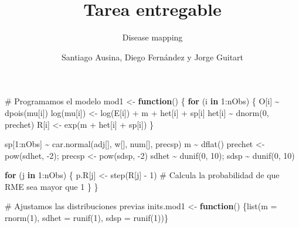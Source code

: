 \documentclass[
  10pt,
  letterpaper,
  DIV=11,
  numbers=noendperiod]{scrartcl}
\title{Tarea entregable}
\subtitle{Disease mapping}
\author{Santiago Ausina, Diego Fernández y Jorge Guitart}
\date{}
\newenvironment{Shaded}{\begin{snugshade}}{\end{snugshade}}
\newcommand{\AttributeTok}[1]{\textcolor[rgb]{0.40,0.45,0.13}{#1}}
\newcommand{\CommentTok}[1]{\textcolor[rgb]{0.37,0.37,0.37}{#1}}
\newcommand{\ControlFlowTok}[1]{\textcolor[rgb]{0.00,0.23,0.31}{\textbf{#1}}}
\newcommand{\DecValTok}[1]{\textcolor[rgb]{0.68,0.00,0.00}{#1}}
\newcommand{\FunctionTok}[1]{\textcolor[rgb]{0.28,0.35,0.67}{#1}}
\newcommand{\NormalTok}[1]{\textcolor[rgb]{0.00,0.23,0.31}{#1}}
\newcommand{\OtherTok}[1]{\textcolor[rgb]{0.00,0.23,0.31}{#1}}
\newcommand{\SpecialCharTok}[1]{\textcolor[rgb]{0.37,0.37,0.37}{#1}}
\begin{document}
\maketitle


\begin{Shaded}
\begin{Highlighting}[]
\CommentTok{\# Programamos el modelo}
\NormalTok{mod1 }\OtherTok{\textless{}{-}} \ControlFlowTok{function}\NormalTok{() \{}
  \ControlFlowTok{for}\NormalTok{ (i }\ControlFlowTok{in} \DecValTok{1}\SpecialCharTok{:}\NormalTok{nObs) \{}
\NormalTok{    O[i] }\SpecialCharTok{\textasciitilde{}} \FunctionTok{dpois}\NormalTok{(mu[i])}
    \FunctionTok{log}\NormalTok{(mu[i]) }\OtherTok{\textless{}{-}} \FunctionTok{log}\NormalTok{(E[i]) }\SpecialCharTok{+}\NormalTok{ m }\SpecialCharTok{+}\NormalTok{ het[i] }\SpecialCharTok{+}\NormalTok{ sp[i]}
\NormalTok{    het[i] }\SpecialCharTok{\textasciitilde{}} \FunctionTok{dnorm}\NormalTok{(}\DecValTok{0}\NormalTok{, prechet)}
\NormalTok{    R[i] }\OtherTok{\textless{}{-}} \FunctionTok{exp}\NormalTok{(m }\SpecialCharTok{+}\NormalTok{ het[i] }\SpecialCharTok{+}\NormalTok{ sp[i])}
\NormalTok{  \}}
  
\NormalTok{  sp[}\DecValTok{1}\SpecialCharTok{:}\NormalTok{nObs] }\SpecialCharTok{\textasciitilde{}} \FunctionTok{car.normal}\NormalTok{(adj[], w[], num[], precsp)}
\NormalTok{  m }\SpecialCharTok{\textasciitilde{}} \FunctionTok{dflat}\NormalTok{()}
\NormalTok{  prechet }\OtherTok{\textless{}{-}} \FunctionTok{pow}\NormalTok{(sdhet, }\SpecialCharTok{{-}}\DecValTok{2}\NormalTok{); precsp }\OtherTok{\textless{}{-}} \FunctionTok{pow}\NormalTok{(sdsp, }\SpecialCharTok{{-}}\DecValTok{2}\NormalTok{)}
\NormalTok{  sdhet }\SpecialCharTok{\textasciitilde{}} \FunctionTok{dunif}\NormalTok{(}\DecValTok{0}\NormalTok{, }\DecValTok{10}\NormalTok{); sdsp }\SpecialCharTok{\textasciitilde{}} \FunctionTok{dunif}\NormalTok{(}\DecValTok{0}\NormalTok{, }\DecValTok{10}\NormalTok{)}
  
  \ControlFlowTok{for}\NormalTok{ (j }\ControlFlowTok{in} \DecValTok{1}\SpecialCharTok{:}\NormalTok{nObs) \{}
\NormalTok{    p.R[j] }\OtherTok{\textless{}{-}} \FunctionTok{step}\NormalTok{(R[j] }\SpecialCharTok{{-}} \DecValTok{1}\NormalTok{) }\CommentTok{\# Calcula la probabilidad de que RME sea mayor que 1}
\NormalTok{  \}}
\NormalTok{\}}

\CommentTok{\# Ajustamos las distribuciones previas}
\NormalTok{inits.mod1 }\OtherTok{\textless{}{-}} \ControlFlowTok{function}\NormalTok{() \{}\FunctionTok{list}\NormalTok{(}\AttributeTok{m =} \FunctionTok{rnorm}\NormalTok{(}\DecValTok{1}\NormalTok{), }
                               \AttributeTok{sdhet =} \FunctionTok{runif}\NormalTok{(}\DecValTok{1}\NormalTok{), }
                               \AttributeTok{sdsp =} \FunctionTok{runif}\NormalTok{(}\DecValTok{1}\NormalTok{))\}}


\end{Highlighting}
\end{Shaded}
\end{document}
